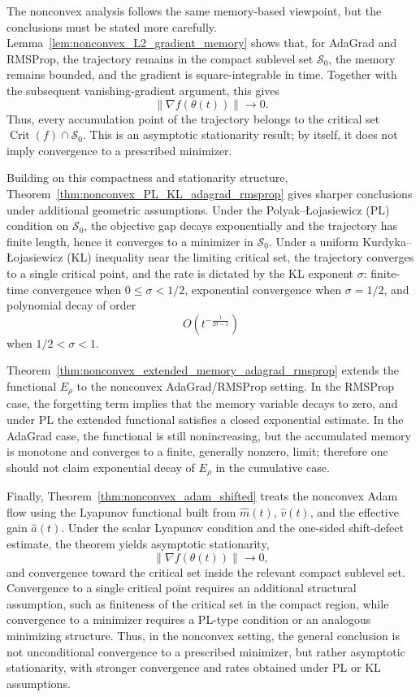 \documentclass{article} %
\begin{document}
The nonconvex analysis follows the same memory-based viewpoint, but the conclusions must be stated more carefully. Lemma~\ref{lem:nonconvex_L2_gradient_memory} shows that, for AdaGrad and RMSProp, the trajectory remains in the compact sublevel set $\mathcal S_0$, the memory remains bounded, and the gradient is square-integrable in time. Together with the subsequent vanishing-gradient argument, this gives
\[
    \|\nabla f(\theta(t))\|\to0.
\]
Thus, every accumulation point of the trajectory belongs to the critical set $\operatorname{Crit}(f)\cap\mathcal S_0$. This is an asymptotic stationarity result; by itself, it does not imply convergence to a prescribed minimizer.

Building on this compactness and stationarity structure, Theorem~\ref{thm:nonconvex_PL_KL_adagrad_rmsprop} gives sharper conclusions under additional geometric assumptions. Under the Polyak--{\L}ojasiewicz (PL) condition on $\mathcal S_0$, the objective gap decays exponentially and the trajectory has finite length, hence it converges to a minimizer in $\mathcal S_0$. Under a uniform Kurdyka--{\L}ojasiewicz (KL) inequality near the limiting critical set, the trajectory converges to a single critical point, and the rate is dictated by the KL exponent $\sigma$: finite-time convergence when $0\leq\sigma<1/2$, exponential convergence when $\sigma=1/2$, and polynomial decay of order
\[
    O\!\left(t^{-\frac{1}{2\sigma-1}}\right)
\]
when $1/2<\sigma<1$.

Theorem~\ref{thm:nonconvex_extended_memory_adagrad_rmsprop} extends the functional $E_\rho$ to the nonconvex AdaGrad/RMSProp setting. In the RMSProp case, the forgetting term implies that the memory variable decays to zero, and under PL the extended functional satisfies a closed exponential estimate. In the AdaGrad case, the functional is still nonincreasing, but the accumulated memory is monotone and converges to a finite, generally nonzero, limit; therefore one should not claim exponential decay of $E_\rho$ in the cumulative case.

Finally, Theorem~\ref{thm:nonconvex_adam_shifted} treats the nonconvex Adam flow using the Lyapunov functional built from $\widehat m(t)$, $\widehat v(t)$, and the effective gain $\widehat a(t)$. Under the scalar Lyapunov condition and the one-sided shift-defect estimate, the theorem yields asymptotic stationarity,
\[
    \|\nabla f(\theta(t))\|\to0,
\]
and convergence toward the critical set inside the relevant compact sublevel set. Convergence to a single critical point requires an additional structural assumption, such as finiteness of the critical set in the compact region, while convergence to a minimizer requires a PL-type condition or an analogous minimizing structure. Thus, in the nonconvex setting, the general conclusion is not unconditional convergence to a prescribed minimizer, but rather asymptotic stationarity, with stronger convergence and rates obtained under PL or KL assumptions.
\end{document}
